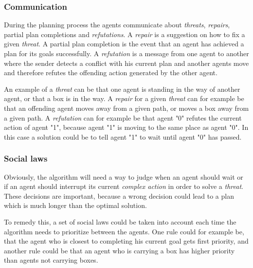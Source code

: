 \documentclass[Main]{subfiles}
\begin{document}
\subsubsection{Communication}
During the planning process the agents communicate about \textit{threats}, \textit{repairs}, partial plan completions and \textit{refutations}.
A \textit{repair} is a suggestion on how to fix a given \textit{threat}.
A partial plan completion is the event that an agent has achieved a plan for its goals successfully.
A \textit{refutation} is a message from one agent to another where the sender
detects a conflict with his current plan and another agents move and therefore
refutes the offending action generated by the other agent.

An example of a \textit{threat} can be that one agent is standing in the way of
another agent, or that a box is in the way.
A \textit{repair} for a given \textit{threat} can for example be that an
offending agent moves away from a given path, or moves a box away from a given
path.
A \textit{refutation} can for example be that agent "0" refutes the current
action of agent "1", because agent "1" is moving to the same place as agent "0".
In this case a solution could be to tell agent "1" to wait until agent "0" has
passed.

\subsubsection{Social laws}
Obviously, the algorithm will need a way to judge when an agent should wait or
if an agent should interrupt its current \textit{complex action} in order to
solve a \textit{threat}. These decisions are important, because a wrong decision
could lead to a plan which is much longer than the optimal solution.

To remedy this, a set of social laws could be taken into account each time the
algorithm needs to prioritize between the agents.
One rule could for example be, that the agent who is closest to completing his
current goal gets first priority, and another rule could be that an agent who is
carrying a box has higher priority than agents not carrying boxes.
\end{document}
